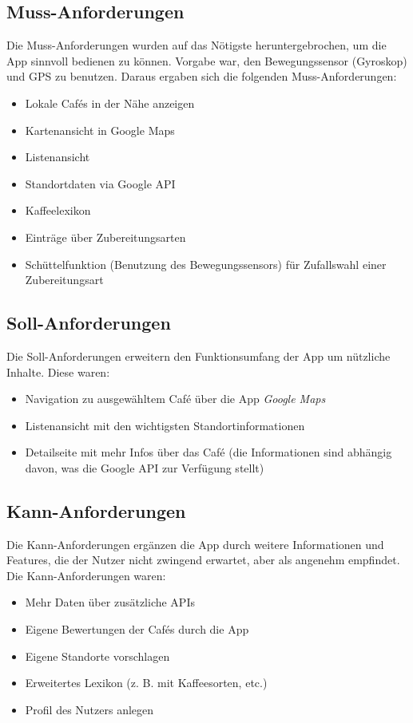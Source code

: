 \subsection{Muss-Anforderungen}
\label{subsec:mussanforderungen}
Die Muss-Anforderungen wurden auf das Nötigste heruntergebrochen, um die App sinnvoll bedienen zu können. Vorgabe war, den Bewegungssensor (Gyroskop) und GPS zu benutzen. Daraus ergaben sich die folgenden Muss-Anforderungen:

\begin{itemize}
	\item Lokale Cafés in der Nähe anzeigen
	\item Kartenansicht in Google Maps
	\item Listenansicht
	\item Standortdaten via Google API
	\item Kaffeelexikon
	\item Einträge über Zubereitungsarten
	\item Schüttelfunktion (Benutzung des Bewegungssensors) für Zufallswahl einer Zubereitungsart
\end{itemize}

\subsection{Soll-Anforderungen}
Die Soll-Anforderungen erweitern den Funktionsumfang der App um nützliche Inhalte. Diese waren:

\begin{itemize}
	\item Navigation zu ausgewähltem Café über die App \emph{Google Maps}
	\item Listenansicht mit den wichtigsten Standortinformationen
	\item Detailseite mit mehr Infos über das Café (die Informationen sind abhängig davon, was die Google API zur Verfügung stellt)
\end{itemize}

\subsection{Kann-Anforderungen}
Die Kann-Anforderungen ergänzen die App durch weitere Informationen und Features, die der Nutzer nicht zwingend erwartet, aber als angenehm empfindet. Die Kann-Anforderungen waren:

\begin{itemize}
	\item Mehr Daten über zusätzliche APIs
	\item Eigene Bewertungen der Cafés durch die App
	\item Eigene Standorte vorschlagen
	\item Erweitertes Lexikon (z. B. mit Kaffeesorten, etc.)
	\item Profil des Nutzers anlegen
\end{itemize}

